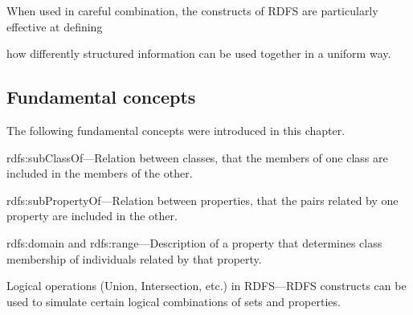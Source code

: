 When used in careful combination, the constructs of RDFS are
particularly effective at defining

how differently structured information can be used together in a uniform
way.

\subsection{Fundamental concepts}

The following fundamental concepts were introduced in this chapter.

rdfs:subClassOf---Relation between classes, that the members of one
class are included in the members of the other.

rdfs:subPropertyOf---Relation between properties, that the pairs related
by one property are included in the other.

rdfs:domain and rdfs:range---Description of a property that determines
class membership
of individuals related by that property.

Logical operations (Union, Intersection, etc.) in RDFS---RDFS constructs
can be used to simulate certain logical combinations of sets and
properties.
